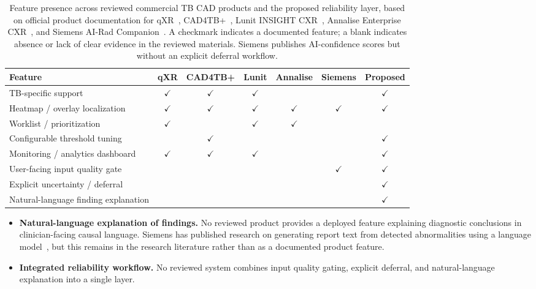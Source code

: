 \documentclass[conference, letterpaper]{IEEEtran}
\begin{document}
\begin{table}[!t]
\renewcommand{\arraystretch}{1.2}
\caption{Feature presence across reviewed commercial TB CAD products and the proposed reliability layer, based on official product documentation for qXR~\cite{qxr_docs}, CAD4TB+~\cite{cad4tb_product}, Lunit INSIGHT CXR~\cite{lunit_product}, Annalise Enterprise CXR~\cite{annalise_product}, and Siemens AI-Rad Companion~\cite{siemens_product}. A checkmark indicates a documented feature; a blank indicates absence or lack of clear evidence in the reviewed materials. Siemens publishes AI-confidence scores but without an explicit deferral workflow.}
\label{tab:product_comparison}
\centering
\small
\begin{tabular}{@{}l c c c c c c@{}}
\toprule
\textbf{Feature} & \textbf{qXR} & \textbf{CAD4TB+} & \textbf{Lunit} & \textbf{Annalise} & \textbf{Siemens} & \textbf{Proposed} \\
\midrule
TB-specific support                       & $\checkmark$ & $\checkmark$ & $\checkmark$ &              &              & $\checkmark$ \\
Heatmap / overlay localization            & $\checkmark$ & $\checkmark$ & $\checkmark$ & $\checkmark$ & $\checkmark$ & $\checkmark$ \\
Worklist / prioritization                 & $\checkmark$ &              & $\checkmark$ & $\checkmark$ &              &              \\
Configurable threshold tuning             &              & $\checkmark$ &              &              &              & $\checkmark$ \\
Monitoring / analytics dashboard          & $\checkmark$ & $\checkmark$ & $\checkmark$ &              &              & $\checkmark$ \\
User-facing input quality gate            &              &              &              &              & $\checkmark$ & $\checkmark$ \\
Explicit uncertainty / deferral           &              &              &              &              &              & $\checkmark$ \\
Natural-language finding explanation      &              &              &              &              &              & $\checkmark$ \\
\bottomrule
\end{tabular}
\end{table}

\begin{itemize}
    \item \textbf{Natural-language explanation of findings.} No reviewed product provides a deployed feature explaining diagnostic conclusions in clinician-facing causal language. Siemens has published research on generating report text from detected abnormalities using a language model~\cite{siemens_llm_cxr_2023}, but this remains in the research literature rather than as a documented product feature.
    \item \textbf{Integrated reliability workflow.} No reviewed system combines input quality gating, explicit deferral, and natural-language explanation into a single layer.
\end{itemize}
\end{document}

